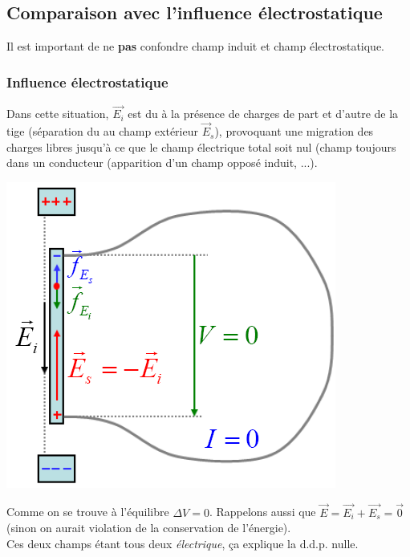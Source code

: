 \documentclass	[11pt, a4paper, openany]{book}
\begin{document}
\subsection{Comparaison avec l'influence électrostatique}
Il est important de ne \textbf{pas} confondre champ induit et champ électrostatique.
\subsubsection*{Influence électrostatique}
Dans cette situation, $\vec{E_i}$ est du à la présence de charges de part et d'autre de la tige (séparation du au champ extérieur $\vec{E}_s$), provoquant une migration des charges libres jusqu'à ce que le champ électrique total soit nul (champ toujours dans un conducteur (apparition d'un champ opposé induit, ...).
\begin{center}
\includegraphics[scale=0.45]{em/image5.png}\\
\end{center}
Comme on se trouve à l'équilibre $\Delta V = 0$. Rappelons aussi que $\vec{E} = \vec{E_i} + \vec{E_s} = \vec{0}$ (sinon on aurait violation de la conservation de l'énergie).\\
Ces deux champs étant tous deux \textit{électrique}, ça explique la d.d.p. nulle.
\end{document}
